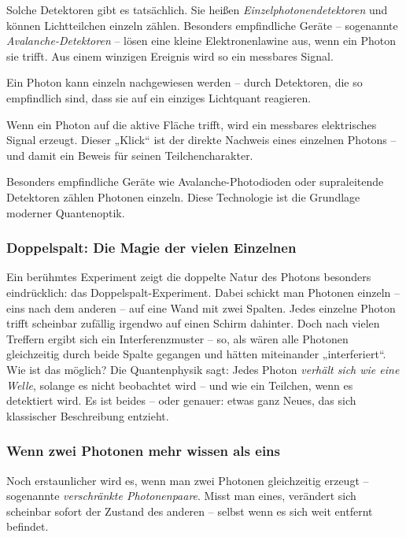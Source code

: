 Solche Detektoren gibt es tatsächlich. Sie heißen \textit{Einzelphotonendetektoren} und können Lichtteilchen einzeln zählen. Besonders empfindliche Geräte – sogenannte \textit{Avalanche-Detektoren} – lösen eine kleine Elektronenlawine aus, wenn ein Photon sie trifft. Aus einem winzigen Ereignis wird so ein messbares Signal.
\vspace{1em}
\begin{tcolorbox}[physikbox, title=Das einzelne Photon – wenn es klickt]
	\label{box:einzelphoton}
	Ein Photon kann einzeln nachgewiesen werden – durch Detektoren, die so empfindlich sind, dass sie auf ein einziges Lichtquant reagieren.
	
	Wenn ein Photon auf die aktive Fläche trifft, wird ein messbares elektrisches Signal erzeugt. Dieser „Klick“ ist der direkte Nachweis eines einzelnen Photons – und damit ein Beweis für seinen Teilchencharakter.
	
	Besonders empfindliche Geräte wie Avalanche-Photodioden oder supraleitende Detektoren zählen Photonen einzeln. Diese Technologie ist die Grundlage moderner Quantenoptik.
\end{tcolorbox}
\vspace{1em}

\subsubsection{Doppelspalt: Die Magie der vielen Einzelnen}
Ein berühmtes Experiment zeigt die doppelte Natur des Photons besonders eindrücklich: das Doppelspalt-Experiment. Dabei schickt man Photonen einzeln – eins nach dem anderen – auf eine Wand mit zwei Spalten.
Jedes einzelne Photon trifft scheinbar zufällig irgendwo auf einen Schirm dahinter. Doch nach vielen Treffern ergibt sich ein Interferenzmuster – so, als wären alle Photonen gleichzeitig durch beide Spalte gegangen und hätten miteinander „interferiert“.
Wie ist das möglich? Die Quantenphysik sagt: Jedes Photon \emph{verhält sich wie eine Welle}, solange es nicht beobachtet wird – und wie ein Teilchen, wenn es detektiert wird. Es ist beides – oder genauer: etwas ganz Neues, das sich klassischer Beschreibung entzieht.

\subsubsection{Wenn zwei Photonen mehr wissen als eins}
Noch erstaunlicher wird es, wenn man zwei Photonen gleichzeitig erzeugt – sogenannte \textit{verschränkte Photonenpaare}. Misst man eines, verändert sich scheinbar sofort der Zustand des anderen – selbst wenn es sich weit entfernt befindet.

